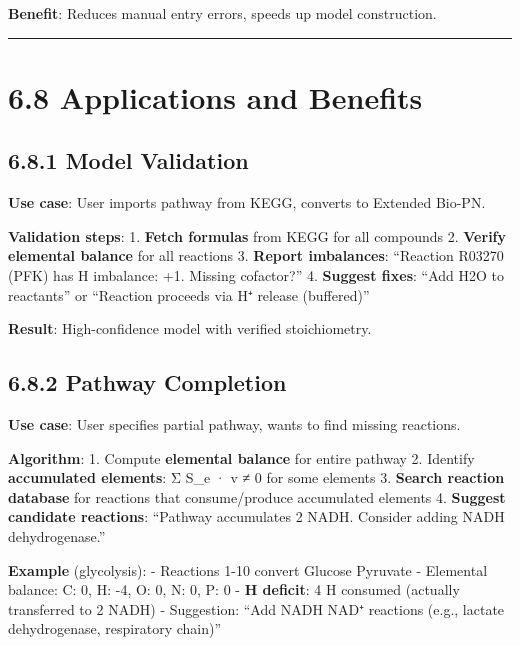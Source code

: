 \textbf{Benefit}: Reduces manual entry errors, speeds up model
construction.

\begin{center}\rule{0.5\linewidth}{0.5pt}\end{center}

\hypertarget{applications-and-benefits}{%
\section{6.8 Applications and
Benefits}\label{applications-and-benefits}}

\hypertarget{model-validation}{%
\subsection{6.8.1 Model Validation}\label{model-validation}}

\textbf{Use case}: User imports pathway from KEGG, converts to Extended
Bio-PN.

\textbf{Validation steps}: 1. \textbf{Fetch formulas} from KEGG for all
compounds 2. \textbf{Verify elemental balance} for all reactions 3.
\textbf{Report imbalances}: ``Reaction R03270 (PFK) has H imbalance: +1.
Missing cofactor?'' 4. \textbf{Suggest fixes}: ``Add H2O to reactants''
or ``Reaction proceeds via H⁺ release (buffered)''

\textbf{Result}: High-confidence model with verified stoichiometry.

\hypertarget{pathway-completion}{%
\subsection{6.8.2 Pathway Completion}\label{pathway-completion}}

\textbf{Use case}: User specifies partial pathway, wants to find missing
reactions.

\textbf{Algorithm}: 1. Compute \textbf{elemental balance} for entire
pathway 2. Identify \textbf{accumulated elements}: Σ S\_e · v ≠ 0 for
some elements 3. \textbf{Search reaction database} for reactions that
consume/produce accumulated elements 4. \textbf{Suggest candidate
reactions}: ``Pathway accumulates 2 NADH. Consider adding NADH
dehydrogenase.''

\textbf{Example} (glycolysis): - Reactions 1-10 convert Glucose 
Pyruvate - Elemental balance: C: 0, H: -4, O: 0, N: 0, P: 0 - \textbf{H
deficit}: 4 H consumed (actually transferred to 2 NADH) - Suggestion:
``Add NADH \textrightarrow NAD⁺ reactions (e.g., lactate dehydrogenase, respiratory
chain)''

